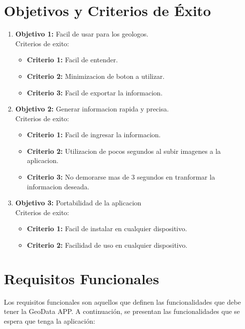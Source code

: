 \documentclass[a4paper,12pt]{article}
\begin{document}
\section{Objetivos y Criterios de Éxito}

\begin{enumerate}
\item \textbf{Objetivo 1:} Facil de usar para los geologos.
\\Criterios de exito:
\begin{itemize}
    \item \textbf{Criterio 1:} Facil de entender.
    \item \textbf{Criterio 2:} Minimizacion de boton a utilizar.
    \item \textbf{Criterio 3:} Facil de exportar la informacion.
\end{itemize}
\item \textbf{Objetivo 2:} Generar informacion rapida y precisa. 
\\Criterios de exito:
\begin{itemize}
    \item \textbf{Criterio 1:} Facil de ingresar la informacion.
    \item \textbf{Criterio 2:} Utilizacion de pocos segundos al subir imagenes a la aplicacion.
    \item \textbf{Criterio 3:} No demorarse mas de 3 segundos en tranformar la informacion deseada.
\end{itemize}
\item \textbf{Objetivo 3:} Portabilidad de la aplicacion
\\Criterios de exito:
\begin{itemize}
    \item \textbf{Criterio 1:} Facil de instalar en cualquier dispositivo.
    \item \textbf{Criterio 2:} Facilidad de uso en cualquier dispositivo.
\end{itemize}

\end{enumerate}

\section{Requisitos Funcionales}
Los requisitos funcionales son aquellos que definen las funcionalidades que debe tener la GeoData APP. A continuación, se presentan las funcionalidades que se espera que tenga la aplicación:
\end{document}
